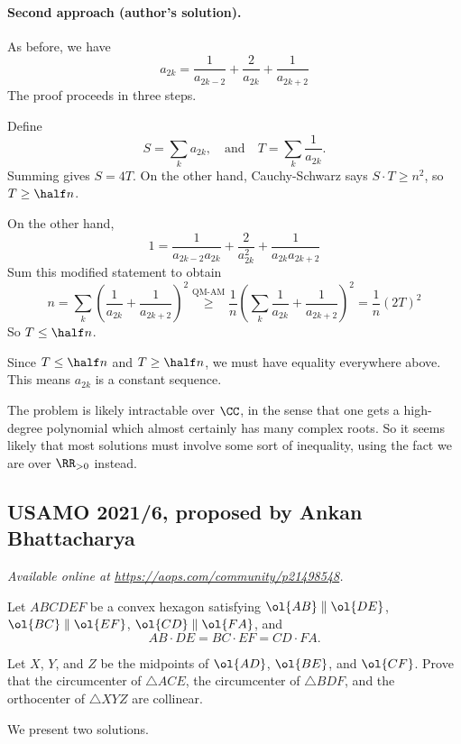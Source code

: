 \documentclass[11pt]{scrartcl}
\begin{document}
\paragraph{Second approach (author's solution).}
As before, we have
\[ a_{2k} = \frac{1}{a_{2k-2}}
  + \frac{2}{a_{2k}} + \frac{1}{a_{2k+2}} \]
The proof proceeds in three steps.
\begin{itemize}
\ii Define
\[ S = \sum_k a_{2k},
  \quad\text{and}\quad
  T = \sum_k \frac{1}{a_{2k}}. \]
Summing gives $S = 4T$.
On the other hand, Cauchy-Schwarz says $S \cdot T \ge n^2$,
so $T \ge \half n$.

\ii On the other hand,
\[ 1 = \frac{1}{a_{2k-2} a_{2k}}
  + \frac{2}{a_{2k}^2} + \frac{1}{a_{2k} a_{2k+2}} \]
Sum this modified statement to obtain
\[
  n = \sum_k \left( \frac{1}{a_{2k}} + \frac{1}{a_{2k+2}} \right)^2
  \overset{\text{QM-AM}}{\ge}
  \frac 1n \left( \sum_k \frac{1}{a_{2k}} + \frac{1}{a_{2k+2}} \right)^2
  = \frac 1n \left( 2T \right)^2
\]
So $T \le \half n$.

\ii Since $T \le \half n$ and $T \ge \half n$,
we must have equality everywhere above.
This means $a_{2k}$ is a constant sequence.
\end{itemize}

\begin{remark*}
  The problem is likely intractable over $\CC$,
  in the sense that one gets a high-degree polynomial
  which almost certainly has many complex roots.
  So it seems likely that most solutions must involve
  some sort of inequality,
  using the fact we are over $\RR_{>0}$ instead.
\end{remark*}
\pagebreak

\subsection{USAMO 2021/6, proposed by Ankan Bhattacharya}
\textsl{Available online at \url{https://aops.com/community/p21498548}.}
\begin{mdframed}[style=mdpurplebox,frametitle={Problem statement}]
Let $ABCDEF$ be a convex hexagon satisfying
$\ol{AB} \parallel \ol{DE}$,
$\ol{BC} \parallel \ol{EF}$,
$\ol{CD} \parallel \ol{FA}$, and
\[ AB \cdot DE = BC \cdot EF = CD \cdot FA. \]

Let $X$, $Y$, and $Z$ be the midpoints
of $\ol{AD}$, $\ol{BE}$, and $\ol{CF}$.
Prove that
the circumcenter of $\triangle ACE$,
the circumcenter of $\triangle BDF$, and
the orthocenter of $\triangle XYZ$ are collinear.
\end{mdframed}
We present two solutions.
\end{document}
